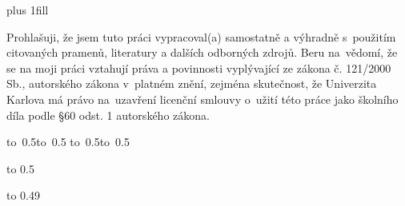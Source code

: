 \newpage


\openright
\hypersetup{pageanchor=true}
\vglue 0pt plus 1fill

\noindent
Prohlašuji, že jsem tuto \ThesisTypeAccusative{} práci vypracoval(a) samostatně a výhradně
s~použitím citovaných pramenů, literatury a dalších odborných zdrojů.
Beru na~vědomí, že se na moji práci vztahují práva a povinnosti vyplývající
ze zákona č. 121/2000 Sb., autorského zákona v~platném znění, zejména skutečnost,
že Univerzita Karlova má právo na~uzavření licenční smlouvy o~užití této
práce jako školního díla podle §60 odst. 1 autorského zákona.

\vspace{10mm}

\hbox{\hbox to 0.5\hbox to 0.5\hsize{\dotfill\quad}}
\smallskip
\hbox{\hbox to 0.5\hsize{}\hbox to 0.5}

\vspace{20mm}
\newpage


\openright

\noindent
\Dedication

\newpage


\openright
{\InfoPageFont

\vtop to 0.5

\vtop to 0.49

}

\newpage

\pagestyle{plain}
